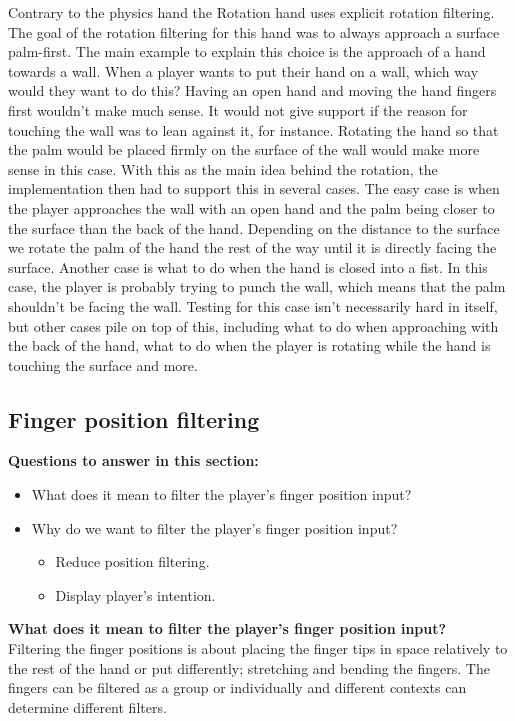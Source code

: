 Contrary to the physics hand the Rotation hand uses explicit rotation filtering. The goal of the rotation filtering for this hand was to always approach a surface palm-first. The main example to explain this choice is the approach of a hand towards a wall. When a player wants to put their hand on a wall, which way would they want to do this? Having an open hand and moving the hand fingers first wouldn't make much sense. It would not give support if the reason for touching the wall was to lean against it, for instance. Rotating the hand so that the palm would be placed firmly on the surface of the wall would make more sense in this case. With this as the main idea behind the rotation, the implementation then had to support this in several cases. The easy case is when the player approaches the wall with an open hand and the palm being closer to the surface than the back of the hand. Depending on the distance to the surface we rotate the palm of the hand the rest of the way until it is directly facing the surface. Another case is what to do when the hand is closed into a fist. In this case, the player is probably trying to punch the wall, which means that the palm shouldn't be facing the wall. Testing for this case isn't necessarily hard in itself, but other cases pile on top of this, including what to do when approaching with the back of the hand, what to do when the player is rotating while the hand is touching the surface and more.

\subsection{Finger position filtering}
\label{subsec:categoryFingerFiltering}
\textbf{Questions to answer in this section:}
\begin{itemize}
\setlength\itemsep{-0.1cm}
\item What does it mean to filter the player's finger position input?
\item Why do we want to filter the player's finger position input?
\begin{itemize}
\setlength\itemsep{-0.1cm}
\item Reduce position filtering.
\item Display player's intention.
\end{itemize}
\end{itemize}

\textbf{What does it mean to filter the player's finger position input?}\\
Filtering the finger positions is about placing the finger tips in space relatively to the rest of the hand or put differently; stretching and bending the fingers. The fingers can be filtered as a group or individually and different contexts can determine different filters.

